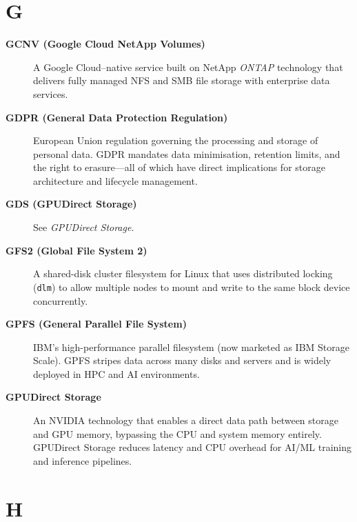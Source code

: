 \section*{G}

\begin{description}

\item[\textbf{GCNV (Google Cloud NetApp Volumes)}]
A Google Cloud--native service built on NetApp \textit{ONTAP} technology that
delivers fully managed NFS and SMB file storage with enterprise data
services.

\item[\textbf{GDPR (General Data Protection Regulation)}]
European Union regulation governing the processing and storage of personal
data. GDPR mandates data minimisation, retention limits, and the right to
erasure---all of which have direct implications for storage architecture
and lifecycle management.

\item[\textbf{GDS (GPUDirect Storage)}]
See \textit{GPUDirect Storage}.

\item[\textbf{GFS2 (Global File System 2)}]
A shared-disk cluster filesystem for Linux that uses distributed locking
(\texttt{dlm}) to allow multiple nodes to mount and write to the same
block device concurrently.

\item[\textbf{GPFS (General Parallel File System)}]
IBM's high-performance parallel filesystem (now marketed as IBM Storage
Scale). GPFS stripes data across many disks and servers and is widely
deployed in HPC and AI environments.

\item[\textbf{GPUDirect Storage}]
An NVIDIA technology that enables a direct data path between storage and GPU
memory, bypassing the CPU and system memory entirely. GPUDirect Storage
reduces latency and CPU overhead for AI/ML training and inference
pipelines.

\end{description}

\section*{H}

